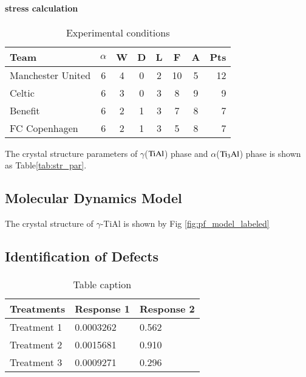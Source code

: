 \documentclass[final,5p,times,twocolumn]{elsarticle}
\begin{document}
\paragraph{stress calculation}

 








\begin{table}[H]
\centering
\caption{Experimental conditions}
\begin{tabular}{l*{6}{c}r}	
		\hline
		Team              & $\alpha$ & W & D & L & F  & A & Pts \\
		\hline
		Manchester United & 6 & 4 & 0 & 2 & 10 & 5 & 12  \\
		Celtic            & 6 & 3 & 0 & 3 &  8 & 9 &  9  \\
		Benefit           & 6 & 2 & 1 & 3 &  7 & 8 &  7  \\
		FC Copenhagen     & 6 & 2 & 1 & 3 &  5 & 8 &  7  \\
		\hline
\end{tabular}
\label{Tab:par}
\end{table}


The crystal structure parameters of $\gamma$($\rm TiAl$) phase and $\alpha$($\rm Ti_3Al$) phase is shown as Table\ref{tab:str_par}. 
\subsection{Molecular Dynamics Model}
The crystal structure of $\gamma$-TiAl
is shown by Fig \ref{fig:pf_model_labeled}

\subsection{Identification of Defects}
\paragraph{}
 \begin{table}[h]
 	\centering
 	\caption{Table caption}
 	\begin{tabular}{l l l}
 		\hline
 		\textbf{Treatments} & \textbf{Response 1} & \textbf{Response 2}\\
 		\hline
 		Treatment 1 & 0.0003262 & 0.562 \\
 		Treatment 2 & 0.0015681 & 0.910 \\
 		Treatment 3 & 0.0009271 & 0.296 \\
 		\hline
 	\end{tabular}
 	
 \end{table}
\end{document}
